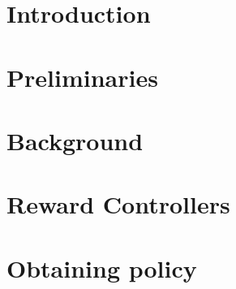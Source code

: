 \documentclass[12pt,twoside]{report}
\begin{document}
	\chapter{Introduction}
	
	
	\chapter{Preliminaries}
	
	
	\chapter{Background}
	
	
	\chapter{Reward Controllers}
	
	
	\chapter{Obtaining policy}
	
	
	
	
	
	

	\newpage
	
	
	
	
	
\end{document}
